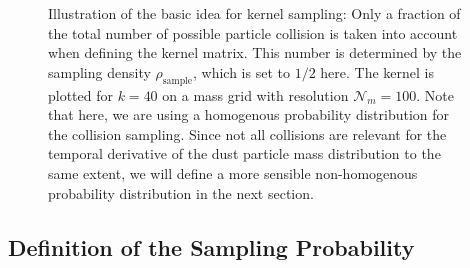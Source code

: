 
\begin{figure}[h!]
    \centering
    \begin{minipage}{.5\linewidth}
        \centering
    \end{minipage}%
    \begin{minipage}{.5\linewidth}
        \centering
    \end{minipage}
    \begin{minipage}{.5\linewidth}
        \centering
    \end{minipage}%
    \begin{minipage}{.5\linewidth}
        \centering
    \end{minipage}
    \caption{
        Illustration of the basic idea for kernel sampling: Only a fraction of the total
        number of possible particle collision is taken into account when defining the 
        kernel matrix. This number is determined by the sampling density $\rho_\text{sample}$,
        which is set to $1/2$ here. 
        The kernel is plotted for $k=40$ on a mass grid with resolution $\mathcal N_m=100$.
        Note that here, we are using a homogenous probability distribution for the collision 
        sampling. Since not all collisions are relevant for the temporal derivative of the 
        dust particle mass distribution to the same extent, we will define a more sensible 
        non-homogenous probability distribution in the next section.
    }
    \label{fig:sampled_kernel_homogenous_probability}
\end{figure} 

\clearpage\subsection{Definition of the Sampling Probability}
\label{sec:definition_of_the_sampling_probability}


